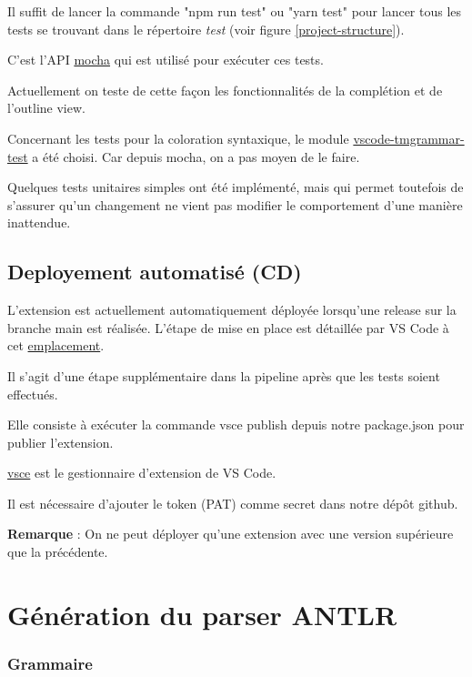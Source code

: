 \documentclass[
    iict, %
    il, %
]{heig-tb}
\begin{document}
Il suffit de lancer la commande "npm run test" ou "yarn test" pour lancer tous les tests se trouvant dans le répertoire \emph{test} (voir figure \ref{project-structure}).

C'est l'API \href{https://mochajs.org/api/}{mocha} qui est utilisé pour exécuter ces tests.

Actuellement on teste de cette façon les fonctionnalités de la complétion et de l'outline view.

Concernant les tests pour la coloration syntaxique, le module \href{https://www.npmjs.com/package/vscode-tmgrammar-test?activeTab}{vscode-tmgrammar-test} a été choisi.
Car depuis mocha, on a pas moyen de le faire.

Quelques tests unitaires simples ont été implémenté, mais qui permet toutefois de s'assurer qu'un changement ne vient pas modifier le comportement d'une manière inattendue.

\subsection{Deployement automatisé (CD)}


L'extension est actuellement automatiquement déployée lorsqu'une release sur la branche main est réalisée.
L'étape de mise en place est détaillée par VS Code à cet \href{https://code.visualstudio.com/api/working-with-extensions/continuous-integration#github-actions}{emplacement}.

Il s'agit d'une étape supplémentaire dans la pipeline après que les tests soient effectués.

Elle consiste à exécuter la commande vsce publish depuis notre package.json pour publier l'extension.

\href{https://www.npmjs.com/package/vsce}{vsce} est le gestionnaire d'extension de VS Code.

Il est nécessaire d'ajouter le token (PAT) comme secret dans notre dépôt github. %

\textbf{Remarque } : On ne peut déployer qu'une extension avec une version supérieure que la précédente. %

\section{Génération du parser ANTLR}
\subsubsection{Grammaire}
\end{document}
